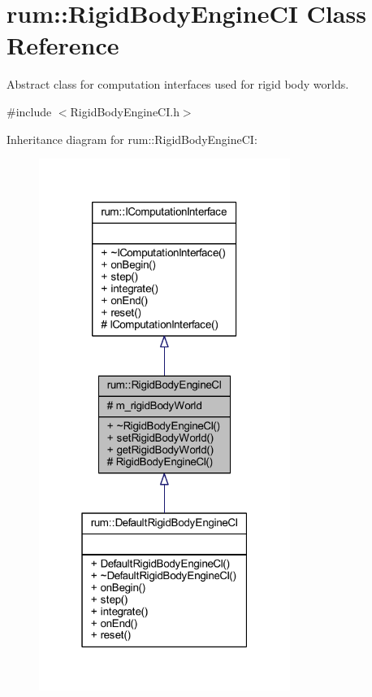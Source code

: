\hypertarget{classrum_1_1_rigid_body_engine_c_i}{}\section{rum\+:\+:Rigid\+Body\+Engine\+CI Class Reference}
\label{classrum_1_1_rigid_body_engine_c_i}


Abstract class for computation interfaces used for rigid body worlds.  




{\ttfamily \#include $<$Rigid\+Body\+Engine\+C\+I.\+h$>$}



Inheritance diagram for rum\+:\+:Rigid\+Body\+Engine\+CI\+:\nopagebreak
\begin{figure}[H]
\begin{center}
\leavevmode
\includegraphics[width=232pt]{classrum_1_1_rigid_body_engine_c_i__inherit__graph}
\end{center}
\end{figure}


